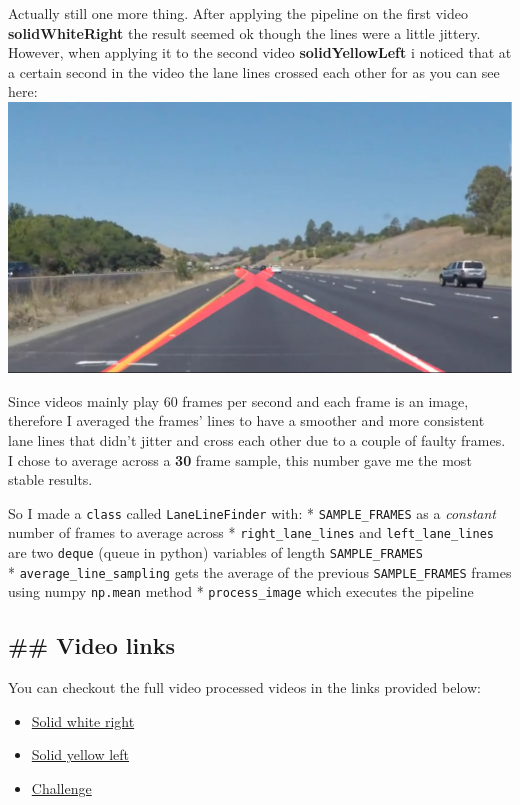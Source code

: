 \documentclass[11pt]{article}
\makeatletter
\def\maxwidth{\ifdim\Gin@nat@width>\linewidth\linewidth
    \else\Gin@nat@width\fi}
\let\Oldincludegraphics\includegraphics
\renewcommand{\includegraphics}[1]{\Oldincludegraphics[width=.8\maxwidth]{#1}}
\providecommand{\tightlist}{%
      \setlength{\itemsep}{0pt}\setlength{\parskip}{0pt}}
\makeatother
\begin{document}
Actually still one more thing. After applying the pipeline on the first
video \textbf{solidWhiteRight} the result seemed ok though the lines
were a little jittery. However, when applying it to the second video
\textbf{solidYellowLeft} i noticed that at a certain second in the video
the lane lines crossed each other for as you can see here:
\includegraphics{test_images_output/crossed_lines.png}

Since videos mainly play 60 frames per second and each frame is an
image, therefore I averaged the frames' lines to have a smoother and
more consistent lane lines that didn't jitter and cross each other due
to a couple of faulty frames. I chose to average across a \textbf{30}
frame sample, this number gave me the most stable results.

So I made a \texttt{class} called \texttt{LaneLineFinder} with: *
\texttt{SAMPLE\_FRAMES} as a \emph{constant} number of frames to average
across * \texttt{right\_lane\_lines} and \texttt{left\_lane\_lines} are
two \texttt{deque} (queue in python) variables of length
\texttt{SAMPLE\_FRAMES}\\
* \texttt{average\_line\_sampling} gets the average of the previous
\texttt{SAMPLE\_FRAMES} frames using numpy \texttt{np.mean} method *
\texttt{process\_image} which executes the pipeline

\hypertarget{video-links}{%
\subsection{\#\# Video links}\label{video-links}}

You can checkout the full video processed videos in the links provided
below:

\begin{itemize}
\tightlist
\item
  \href{https://youtu.be/kV6LGD-cY3I}{Solid white right}
\item
  \href{https://youtu.be/iUBEwLEFOYI}{Solid yellow left}
\item
  \href{https://youtu.be/MwuveIP4Lpc}{Challenge}
\end{itemize}
\end{document}
